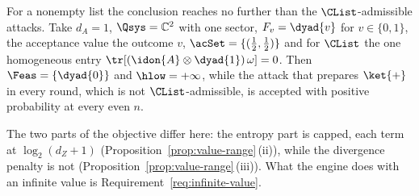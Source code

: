 \begin{remark}
For a nonempty list the conclusion reaches no further than the
$\CList$-admissible attacks. Take $d_A=1$, $\Qsys=\mathbb{C}^2$ with one
sector, $F_v=\dyad{v}$ for $v\in\{0,1\}$, the acceptance value the outcome
$v$, $\acSet=\{(\frac12,\frac12)\}$ and for $\CList$ the one homogeneous
entry $\tr[(\idon{A}\otimes\dyad{1})\,\omega]=0$. Then
$\Feas=\{\dyad{0}\}$ and $\hlow=+\infty$, while the attack that prepares
$\ket{+}$ in every round, which is not $\CList$-admissible, is accepted with
positive probability at every even $n$.

The two parts of the objective differ here: the entropy part is capped, each
term at $\log_2(d_Z+1)$ (Proposition~\ref{prop:value-range}\,(ii)), while the
divergence penalty is not (Proposition~\ref{prop:value-range}\,(iii)). What
the engine does with an infinite value is
Requirement~\ref{req:infinite-value}.
\end{remark}
